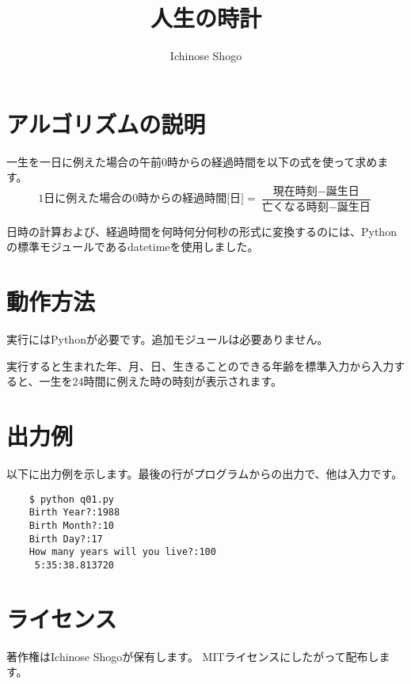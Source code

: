 \documentclass{jsarticle}
\title{人生の時計}
\author{Ichinose Shogo}
\begin{document}
\maketitle

\section{アルゴリズムの説明}
一生を一日に例えた場合の午前0時からの経過時間を以下の式を使って求めます。
\[
\textrm{1日に例えた場合の0時からの経過時間[日]} = \frac{\textrm{現在時刻}-\textrm{誕生日}}{\textrm{亡くなる時刻}-\textrm{誕生日}}
\]

日時の計算および、経過時間を何時何分何秒の形式に変換するのには、Pythonの標準モジュールであるdatetimeを使用しました。

\section{動作方法}
実行にはPythonが必要です。追加モジュールは必要ありません。

実行すると生まれた年、月、日、生きることのできる年齢を標準入力から入力すると、一生を24時間に例えた時の時刻が表示されます。

\section{出力例}
以下に出力例を示します。最後の行がプログラムからの出力で、他は入力です。
\begin{verbatim}
    $ python q01.py
    Birth Year?:1988
    Birth Month?:10
    Birth Day?:17
    How many years will you live?:100
     5:35:38.813720
\end{verbatim}

\section{ライセンス}
著作権はIchinose Shogoが保有します。
MITライセンスにしたがって配布します。
\end{document}
